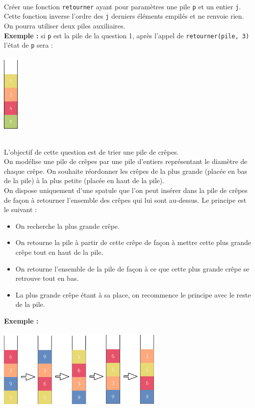 \documentclass[a4paper,12pt,eval,firamath]{nsi}
\begin{document}
\\


\question Créer une fonction \texttt{retourner}  ayant pour paramètres une pile \texttt{p}  et un entier \texttt{j}. Cette fonction inverse l'ordre des \texttt{j} derniers éléments empilés et ne renvoie rien. On pourra utiliser deux piles auxiliaires.\\
\textbf{Exemple :} si \texttt{p}  est la pile de la question 1, après l'appel de \texttt{retourner(pile, 3)} l'état de \texttt{p} sera :
\begin{center}
      \includegraphics[width=0.75cm]{img/pile2.png}
\end{center}
\\


\question L'objectif de cette question est de trier une pile de crêpes.\\
On modélise une pile de crêpes par une pile d'entiers représentant le diamètre de chaque crêpe. On souhaite réordonner les crêpes de la plus grande (placée en bas de la pile) à la plus petite (placée en
haut de la pile).\\
On dispose uniquement d'une spatule que l'on peut insérer dans la pile de crêpes de façon à retourner
l'ensemble des crêpes qui lui sont au-dessus.
Le principe est le suivant :
\begin{itemize}
      \item On recherche la plus grande crêpe.
      \item On retourne la pile à partir de cette crêpe de façon à mettre cette plus grande crêpe tout en haut de la pile.
      \item On retourne l'ensemble de la pile de façon à ce que cette plus grande crêpe se retrouve tout en bas.
      \item La plus grande crêpe étant à sa place, on recommence le principe avec le reste de la pile.
\end{itemize}
\textbf{Exemple : }

\begin{center}
      \includegraphics[width=8.1cm]{img/pile3.png}
\end{center}
\end{document}
